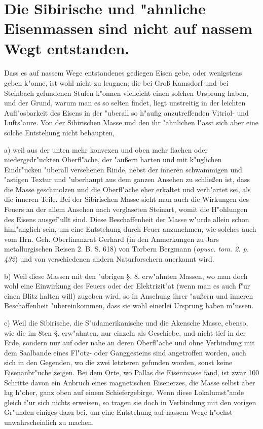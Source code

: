 \documentclass[a4paper, 11pt, oneside, polutonikogreek, german]{article}
\begin{document}
\section{Die Sibirische und "ahnliche Eisenmassen sind nicht auf nassem Wegt entstanden.}
\paragraph{}
Dass es auf nassem Wege entstandenes gediegen Eisen gebe, oder wenigstens geben k"onne, ist wohl nicht zu leugnen; die bei Groß Kamsdorf und bei Steinbach gefundenen Stufen k"onnen vielleicht einen solchen Ursprung haben, und der Grund, warum man es so selten findet, liegt unstreitig in der leichten Aufl"osbarkeit des Eisens in der "uberall so h"aufig anzutreffenden Vitriol- und Lufts"aure. Von der Sibirischen Masse und den ihr "ahnlichen l"asst sich aber eine solche Entstehung nicht behaupten,

a) weil aus der unten mehr konvexen und oben mehr flachen oder niedergedr"uckten Oberfl"ache, der "außern harten und mit k"uglichen Eindr"ucken "uberall versehenen Rinde, nebst der inneren schwammigen und "astigen Textur und "uberhaupt aus dem ganzen Ansehen zu schließen ist, dass die Masse geschmolzen und die Oberfl"ache eher erkaltet und verh"artet sei, als die inneren Teile. Bei der Sibirischen Masse sieht man auch die Wirkungen des Feuers an der allem Ansehen nach verglaseten Steinart, womit die H"ohlungen des Eisens ausgef"ullt sind. Diese Beschaffenheit der Masse w"urde allein schon hinl"anglich sein, um eine Entstehung durch Feuer anzunehmen, wie solches auch vom Hrn. Geh. Oberfinanzrat Gerhard (in den Anmerkungen zu Jars metallurgischen Reisen 2. B. S. 618) von Torbern Bergmann (\emph{opusc. tom. 2. p. 432}) und von verschiedenen andern Naturforschern anerkannt wird.

b) Weil diese Massen mit den "ubrigen §. 8. erw"ahnten Massen, wo man doch wohl eine Einwirkung des Feuers oder der Elektrizit"at (wenn man es auch f"ur einen Blitz halten will) zugeben wird, so in Ansehung ihrer "außern und inneren Beschaffenheit "ubereinkommen, dass sie wohl einerlei Ursprung haben m"ussen.

c) Weil die Sibirische, die S"udamerikanische und die Akensche Masse, ebenso, wie die im 8ten §. erw"ahnten, nur einzeln als Geschiebe, und nicht tief in der Erde, sondern nur auf oder nahe an deren Oberfl"ache und ohne Verbindung mit dem Saalbande eines Fl"otz- oder Ganggesteins sind angetroffen worden, auch sich in den Gegenden, wo die zwei letzteren gefunden worden, sonst keine Eisenanbr"uche zeigen. Bei dem Orte, wo Pallas die Eisenmasse fand, ist zwar 100 Schritte davon ein Anbruch eines magnetischen Eisenerzes, die Masse selbst aber lag h"oher, ganz oben auf einem Schiefergebirge. Wenn diese Lokalumst"ande gleich f"ur sich nichts erweisen, so tragen sie doch in Verbindung mit den vorigen Gr"unden einiges dazu bei, um eine Entstehung auf nassem Wege h"ochst unwahrscheinlich zu machen.
\clearpage
\end{document}
